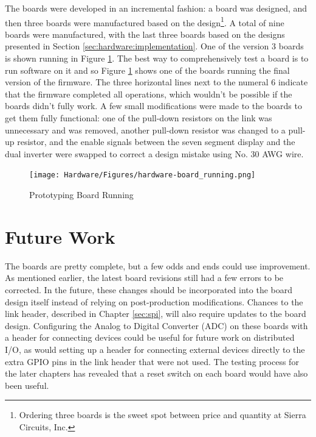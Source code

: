 The boards were developed in an incremental fashion: a board was designed, and then three boards were manufactured based on the design\footnote{Ordering three boards is the sweet spot between price and quantity at Sierra Circuits, Inc.}. A total of nine boards were manufactured, with the last three boards based on the designs presented in Section \ref{sec:hardware:implementation}. One of the version 3 boards is shown running in Figure \ref{fig:hardware:board_running}. The best way to comprehensively test a board is to run software on it and so Figure \ref{fig:hardware:board_running} shows one of the boards running the final version of the firmware. The three horizontal lines next to the numeral 6 indicate that the firmware completed all operations, which wouldn't be possible if the boards didn't fully work. A few small modifications were made to the boards to get them fully functional: one of the pull-down resistors on the link was unnecessary and was removed, another pull-down resistor was changed to a pull-up resistor, and the enable signals between the seven segment display and the dual inverter were swapped to correct a design mistake using No. 30 AWG wire.
\begin{figure}[ptb]
	\begin{centering}
		\texttt{[image: Hardware/Figures/hardware-board\_running.png]}
		\caption{Prototyping Board Running}
		\label{fig:hardware:board_running}
	\end{centering}
\end{figure}

\section{Future Work}\label{sec:hardware:future_work}

The boards are pretty complete, but a few odds and ends could use improvement. As mentioned earlier, the latest board revisions still had a few errors to be corrected. In the future, these changes should be incorporated into the board design itself instead of relying on post-production modifications. Chances to the link header, described in Chapter \ref{sec:spi}, will also require updates to the board design. Configuring the Analog to Digital Converter (ADC) on these boards with a header for connecting devices could be useful for future work on distributed I/O, as would setting up a header for connecting external devices directly to the extra GPIO pins in the link header that were not used. The testing process for the later chapters has revealed that a reset switch on each board would have also been useful.

